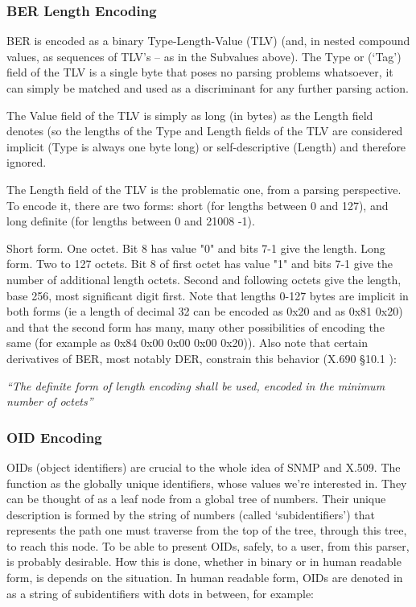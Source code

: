 \subsubsection{BER Length Encoding}
BER is encoded as a binary Type-Length-Value (TLV) (and, in nested 
compound values, as sequences of TLV’s – as in the Subvalues above).
The Type or (‘Tag’) field of the TLV is a single byte that poses no 
parsing problems whatsoever, it can simply be matched and used as a 
discriminant for any further parsing action.

The Value field of the TLV is simply as long (in bytes) as the Length 
field denotes (so the lengths of the Type and Length fields of the TLV are 
considered implicit (Type is always one byte long) or self-descriptive 
(Length) and therefore ignored.

The Length field of the TLV is the problematic one, from a parsing 
perspective. To encode it, there are two forms: short (for lengths between 
0 and 127), and long definite (for lengths between 0 and 21008 -1).
 
Short form. One octet. Bit 8 has value "0" and bits 7-1 give the length. 
Long form. Two to 127 octets. Bit 8 of first octet has value "1" and bits 
7-1 give the number of additional length octets. Second and following 
octets give the length, base 256, most significant digit first.
\cite{bib:x690}
Note that lengths 0-127 bytes are implicit in both forms (ie a length of 
decimal 32 can be encoded as 0x20 and as 0x81 0x20) and that the second 
form has many, many other possibilities of encoding the same (for example 
as 0x84 0x00 0x00 0x00 0x20)). Also note that certain derivatives of BER, 
most notably DER, constrain this behavior (X.690 §10.1 \cite{bib:x690}):

\textit{“The definite form of 
length encoding shall be used, encoded in the minimum number of octets”}

\subsubsection{OID Encoding}

OIDs (object identifiers) are crucial to the whole idea of SNMP and X.509. 
The function as the globally unique identifiers, whose values we’re 
interested in. They can be thought of as a leaf node from a global tree of 
numbers. Their unique description is formed by the string of numbers 
(called ‘subidentifiers’) that represents the path one must traverse 
from the top of the tree, through this tree, to reach this node.
To be able to present OIDs, safely, to a user, from this parser, is 
probably desirable. How this is done, whether in binary or in human 
readable form, is depends on the situation. In human readable form, OIDs 
are denoted in as a string of subidentifiers with dots in between,
for example:

